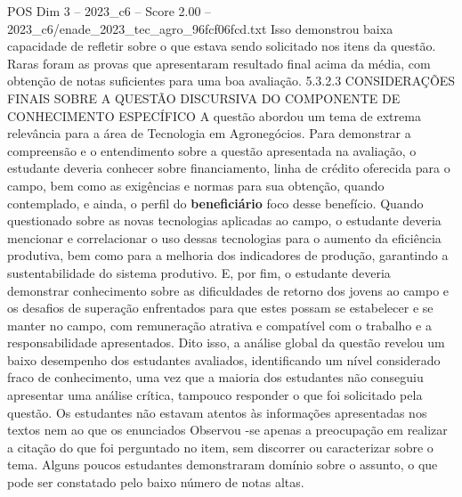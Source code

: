 \begin{textsample}{POS Dim 3 – 2023\_c6 – Score 2.00 – 2023\_c6/enade\_2023\_tec\_agro\_96fcf06fcd.txt}
Isso demonstrou baixa capacidade de refletir sobre o que estava sendo solicitado nos itens da questão.
Raras foram as provas que apresentaram resultado final acima da média, com obtenção de notas suficientes para uma boa avaliação. 5.3.2.3 CONSIDERAÇÕES FINAIS SOBRE A QUESTÃO DISCURSIVA DO COMPONENTE DE CONHECIMENTO ESPECÍFICO A questão abordou um tema de extrema relevância para a área de Tecnologia em Agronegócios.
Para demonstrar a compreensão e o entendimento sobre a questão apresentada na avaliação, o estudante deveria conhecer sobre financiamento, linha de crédito oferecida para o campo, bem como as exigências e normas para sua obtenção, quando contemplado, e ainda, o perfil do \textbf{beneficiário} foco desse benefício.
Quando questionado sobre as novas tecnologias aplicadas ao campo, o estudante deveria mencionar e correlacionar o uso dessas tecnologias para o aumento da eficiência produtiva, bem como para a melhoria dos indicadores de produção, garantindo a sustentabilidade do sistema produtivo.
E, por fim, o estudante deveria demonstrar conhecimento sobre as dificuldades de retorno dos jovens ao campo e os desafios de superação enfrentados para que estes possam se estabelecer e se manter no campo, com remuneração atrativa e compatível com o trabalho e a responsabilidade apresentados.
Dito isso, a análise global da questão revelou um baixo desempenho dos estudantes avaliados, identificando um nível considerado fraco de conhecimento, uma vez que a maioria dos estudantes não conseguiu apresentar uma análise crítica, tampouco responder o que foi solicitado pela questão.
Os estudantes não estavam atentos às informações apresentadas nos textos nem ao que os enunciados Observou -se apenas a preocupação em realizar a citação do que foi perguntado no item, sem discorrer ou caracterizar sobre o tema.
Alguns poucos estudantes demonstraram domínio sobre o assunto, o que pode ser constatado pelo baixo número de notas altas.

\end{textsample}
